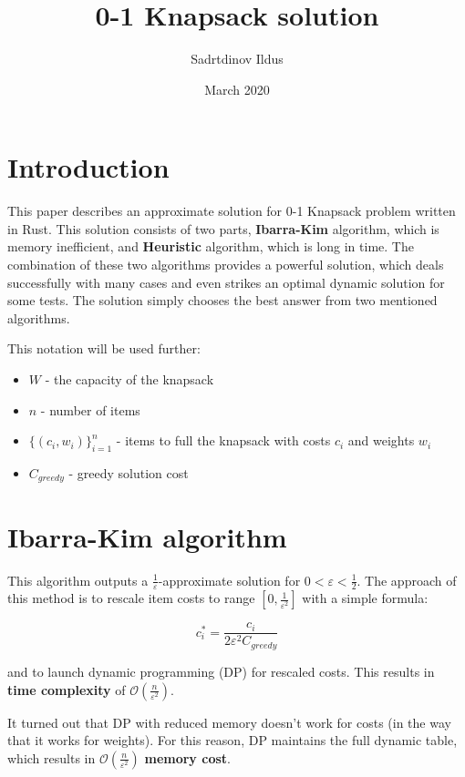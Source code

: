 \documentclass{article}
\title{0-1 Knapsack solution}
\author{Sadrtdinov Ildus}
\date{March 2020}
\begin{document}
\maketitle

\section{Introduction}

This paper describes an approximate solution for 0-1 Knapsack problem written in Rust. This solution consists of two parts, \textbf{Ibarra-Kim} algorithm, which is memory inefficient, and \textbf{Heuristic} algorithm, which is long in time. The combination of these two algorithms provides a powerful solution, which deals successfully with many cases and even strikes an optimal dynamic solution for some tests. The solution simply chooses the best answer from two mentioned algorithms.

\vspace{0.3cm}

This notation will be used further:

\begin{itemize}
    \item $W$ - the capacity of the knapsack
    \item $n$ - number of items
    \item $\{(c_i, w_i)\}_{i=1}^n$ - items to full the knapsack with costs $c_i$ and weights $w_i$
    \item $C_{greedy}$ - greedy solution cost
\end{itemize}

\section{Ibarra-Kim algorithm}

This algorithm outputs a $\frac{1}{\varepsilon}$-approximate solution for $0 < \varepsilon < \frac{1}{2}$. The approach of this method is to rescale item costs to range $\left[0, \frac{1}{\varepsilon^2}\right]$ with a simple formula:

$$
c_i^{*} = \frac{c_i}{2\varepsilon^2 C_{greedy}}
$$

\noindent
and to launch dynamic programming (DP) for rescaled costs. This results in \textbf{time complexity} of $\mathcal{O}\left(\frac{n}{\varepsilon^2}\right)$.

It turned out that DP with reduced memory doesn't work for costs (in the way that it works for weights). For this reason, DP maintains the full dynamic table, which results in $\mathcal{O}\left(\frac{n}{\varepsilon^2}\right)$ \textbf{memory cost}.
\end{document}

